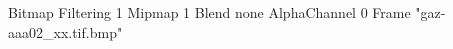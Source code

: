 {Bitmap
	{Filtering 1}
	{Mipmap 1}
	{Blend none}
	{AlphaChannel 0}
	{Frame "gaz-aaa02_xx.tif.bmp"}
}

